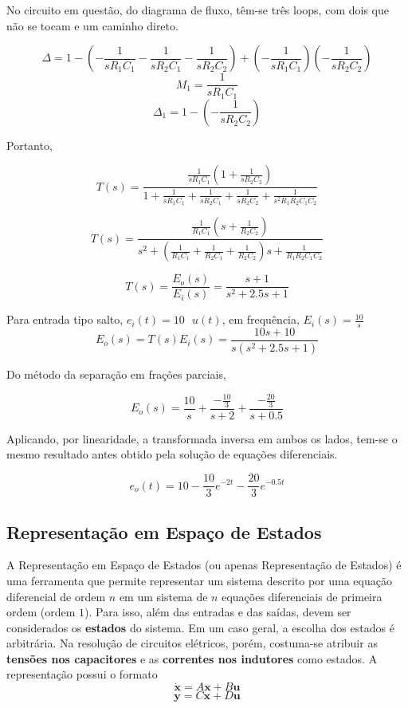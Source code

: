 \documentclass{article}
\numberwithin{equation}{section}
\begin{document}
    No circuito em questão, do diagrama de fluxo, têm-se três loops, com dois que não se tocam e um caminho direto.

    $$\Delta = 1 - \left(-\frac{1}{sR_{1}C_{1}}-\frac{1}{sR_{2}C_{1}}-\frac{1}{sR_{2}C_{2}}\right) + \left(-\frac{1}{sR_{1}C_{1}}\right) \left(-\frac{1}{sR_{2}C_{2}}\right) $$
    $$M_{1} = \frac{1}{sR_{1}C_{1}} $$
    $$\Delta_{1} = 1 - \left(-\frac{1}{sR_{2}C_{2}}\right)$$

    Portanto,

    $$T(s) = \frac{\displaystyle{\frac{1}{sR_{1}C_{1}}} \left(1 +\displaystyle{\frac{1}{sR_{2}C_{2}}}\right)}{1 + \displaystyle{\frac{1}{sR_{1}C_{1}}}+\displaystyle{\frac{1}{sR_{2}C_{1}}}+\displaystyle{\frac{1}{sR_{2}C_{2}}} + \frac{1}{s^2R_{1}R_{2}C_{1}C_{2}}}$$

    $$T(s) = \frac{\displaystyle{\frac{1}{R_{1}C_{1}}} \left(s +\displaystyle{\frac{1}{R_{2}C_{2}}}\right)}{s^2 + \left(\displaystyle{\frac{1}{R_{1}C_{1}}}+\displaystyle{\frac{1}{R_{2}C_{1}}}+\displaystyle{\frac{1}{R_{2}C_{2}}}\right)s + \displaystyle{\frac{1}{R_{1}R_{2}C_{1}C_{2}}}}$$

    $$T(s) = \frac{E_{o}(s)}{E_{i}(s)} =\displaystyle{\frac{s+1}{s^2+2.5s+1}}$$

    Para entrada tipo salto, $e_i(t) = 10 \text{ } u(t)$, em frequência, $E_{i}(s)=\displaystyle{\frac{10}{s}}$
    $$E_{o}(s)=T(s)E_{i}(s)=\displaystyle{\frac{10s+10}{s(s^2+2.5s+1)}}$$

    Do método da separação em frações parciais,

    $$E_{o}(s) = \frac{10}{s} +\frac{-\displaystyle{\frac{10}{3}}}{s+2} +\frac{-\displaystyle{\frac{20}{3}}}{s+0.5}$$

    Aplicando, por linearidade, a transformada inversa em ambos os lados, tem-se o mesmo resultado antes obtido pela solução de equações diferenciais.

    $$e_{o}(t) = 10 - \frac{10}{3}e^{-2t} - \frac{20}{3}e^{-0.5t}$$

    \subsection{Representação em Espaço de Estados}
    \label{subsec:estado}
    A Representação em Espaço de Estados (ou apenas Representação de Estados) é uma ferramenta que permite representar um sistema descrito por uma equação diferencial de ordem $n$ em um sistema de $n$ equações diferenciais de primeira ordem (ordem $1$). Para isso, além das entradas e das saídas, devem ser considerados os \textbf{estados} do sistema. Em um caso geral, a escolha dos estados é arbitrária. Na resolução de circuitos elétricos, porém, costuma-se atribuir as \textbf{tensões nos capacitores} e as \textbf{correntes nos indutores} como estados. A representação possui o formato
    \begin{equation}
        \dot{\textbf{x}}=A\textbf{x}+B\textbf{u}
    \end{equation}
    \begin{equation}
        \textbf{y}=C\textbf{x}+D\textbf{u}
    \end{equation}
\end{document}

